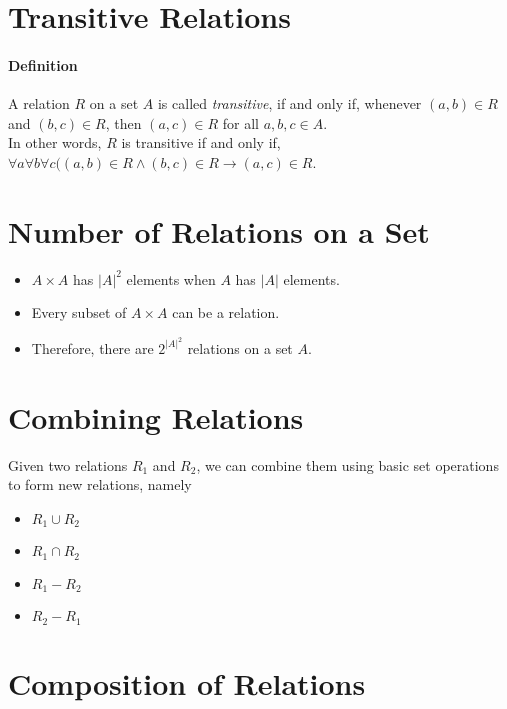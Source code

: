 \documentclass[10pt,a4paper]{book}
\begin{document}
\section{Transitive Relations}

\paragraph*{Definition}
$\ $\\
\hspace*{\parindent}A relation $R$ on a set $A$ is called \textit{transitive}, if and only if, whenever $(a,b) \in R$ and $(b,c) \in R$, then $(a,c) \in R$ for all $a,b,c \in A$.\\
\hspace*{\parindent}In other words, $R$ is transitive if and only if, $\forall a \forall b \forall c ((a,b) \in R \land (b,c) \in R \to (a,c) \in R$.

\section{Number of Relations on a Set}
\begin{itemize}
\item $A \times A$ has $|A|^2$ elements when $A$ has $|A|$ elements.
\item Every subset of $A \times A$ can be a relation.
\item Therefore, there are $2^{{|A|}^2}$ relations on a set $A$.
\end{itemize}

\section{Combining Relations}
Given two relations $R_1$ and $R_2$, we can combine them using basic set operations to form new relations, namely
\begin{itemize}
\item $R_1 \cup R_2$
\item $R_1 \cap R_2$
\item $R_1 - R_2$
\item $R_2 - R_1$
\end{itemize}

\section{Composition of Relations}
\end{document}
